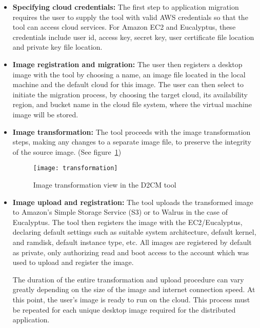 \documentclass[a4paper,10pt]{article}
\begin{document}
\begin{itemize}

\item{\textbf{Specifying cloud credentials:}
The first step to application migration requires the user to supply the tool with valid AWS credentials so that the tool can access cloud services. For Amazon EC2 and Eucalyptus, these credentials include user id, access key, secret key, user certificate file location and private key file location.}





\item{\textbf{Image registration and migration:}
The user then registers a desktop image with the tool by choosing a name, an image file located in the local machine and the default cloud for this image. The user can then select to initiate the migration process, by choosing the target cloud, its availability region, and bucket name in the cloud file system, where the virtual machine image will be stored.} 



\item{\textbf{Image transformation:}
The tool proceeds with the image transformation steps, making any changes to a separate image file, to preserve the integrity of the source image. (See figure~\ref{fig:transformation})}

\begin{figure}
\centering
\texttt{[image: transformation]}
\caption{Image transformation view in the D2CM tool}
\label{fig:transformation}
\end{figure}



\item{\textbf{Image upload and registration:}
The tool uploads the transformed image to Amazon's Simple Storage Service (S3) \cite{amazon:s3} or to Walrus in the case of Eucalyptus. The tool then registers the image with the EC2/Eucalyptus, declaring default settings such as suitable system architecture, default kernel, and ramdisk, default instance type, etc. All images are registered by default as private, only authorizing read and boot access to the account which was used to upload and register the image.

The duration of the entire transformation and upload procedure can vary greatly depending on the size of the image and internet connection speed. At this point, the user's image is ready to run on the cloud. This process must be repeated for each unique desktop image required for the distributed application.}

\end{itemize}
\end{document}
